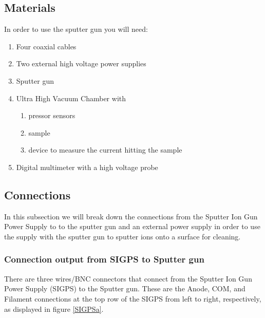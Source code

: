 \documentclass[11pt,a4paper]{report}
\begin{document}
\subsection{Materials}
{In  order to use the sputter gun you will need:}
\begin{enumerate}
	\item  Four coaxial cables
	\item Two external high voltage power supplies
	\item  Sputter gun
           \item  Ultra High Vacuum Chamber with 
      \begin{enumerate}
                 \item pressor sensors 
                 \item  sample
                 \item device to measure the current hitting the sample
       \end{enumerate}
           \item  Digital multimeter with a high voltage probe 
\end{enumerate}


\subsection{Connections}
In this subsection we will break down the connections from the Sputter Ion Gun Power Supply to to the sputter gun and an external power supply in order to use the supply with the sputter gun to sputter ions onto a surface for cleaning.

\subsubsection{Connection output from SIGPS to Sputter gun}
There are three wires/BNC connectors that connect from the Sputter Ion Gun Power Supply (SIGPS) to the Sputter gun. These are the Anode, COM, and Filament connections at the top row of the SIGPS from left to right, respectively, as displayed in figure \ref{SIGPSa}. 
\end{document}
